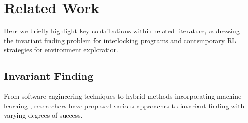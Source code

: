 \documentclass[conference,compsoc]{IEEEtran}
\begin{document}
\section{Related Work}
Here we briefly highlight key contributions within related literature, addressing the invariant finding problem for interlocking programs and contemporary RL strategies for environment exploration.

\subsection{Invariant Finding}
From software engineering techniques \cite{case2007automated, bensalem1996powerful} to hybrid methods incorporating machine learning \cite{garg2016learning}, researchers have proposed various approaches to invariant finding with varying degrees of success. 
\end{document}
